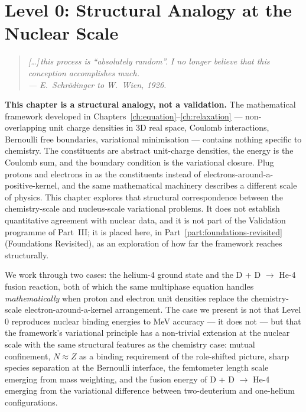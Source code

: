 \chapter{Level 0: Structural Analogy at the Nuclear Scale}\label{ch:nucleus}

\begin{quote}
\itshape [\ldots]\,this process is ``absolutely random''. I no longer believe that this conception accomplishes much.\\
\normalfont\hfill --- E.~Schr\"odinger to W.~Wien, 1926.
\end{quote}
\bigskip

\textbf{This chapter is a structural analogy, not a validation.} The mathematical framework developed in Chapters~\ref{ch:equation}--\ref{ch:relaxation} --- non-overlapping unit charge densities in 3D real space, Coulomb interactions, Bernoulli free boundaries, variational minimisation --- contains nothing specific to chemistry. The constituents are abstract unit-charge densities, the energy is the Coulomb sum, and the boundary condition is the variational closure. Plug protons and electrons in as the constituents instead of electrons-around-a-positive-kernel, and the same mathematical machinery describes a different scale of physics. This chapter explores that structural correspondence between the chemistry-scale and nucleus-scale variational problems. It does not establish quantitative agreement with nuclear data, and it is not part of the Validation programme of Part~III; it is placed here, in Part~\ref{part:foundations-revisited} (Foundations Revisited), as an exploration of how far the framework reaches structurally.

We work through two cases: the helium-4 ground state and the D + D $\to$ He-4 fusion reaction, both of which the same multiphase equation handles \emph{mathematically} when proton and electron unit densities replace the chemistry-scale electron-around-a-kernel arrangement. The case we present is not that Level 0 reproduces nuclear binding energies to MeV accuracy --- it does not --- but that the framework's variational principle has a non-trivial extension at the nuclear scale with the same structural features as the chemistry case: mutual confinement, $N \approx Z$ as a binding requirement of the role-shifted picture, sharp species separation at the Bernoulli interface, the femtometer length scale emerging from mass weighting, and the fusion energy of D + D $\to$ He-4 emerging from the variational difference between two-deuterium and one-helium configurations.

